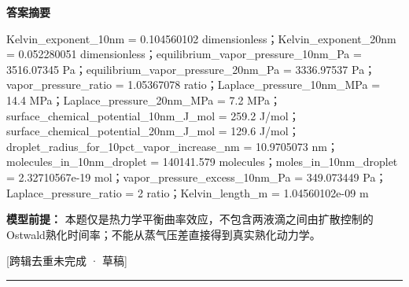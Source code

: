 \documentclass[UTF8,11pt,a4paper]{ctexart}
\begin{document}
\noindent\textbf{答案摘要}\par
Kelvin\_exponent\_10nm = 0.104560102 dimensionless；Kelvin\_exponent\_20nm = 0.052280051 dimensionless；equilibrium\_vapor\_pressure\_10nm\_Pa = 3516.07345 Pa；equilibrium\_vapor\_pressure\_20nm\_Pa = 3336.97537 Pa；vapor\_pressure\_ratio = 1.05367078 ratio；Laplace\_pressure\_10nm\_MPa = 14.4 MPa；Laplace\_pressure\_20nm\_MPa = 7.2 MPa；surface\_chemical\_potential\_10nm\_J\_mol = 259.2 J/mol；surface\_chemical\_potential\_20nm\_J\_mol = 129.6 J/mol；droplet\_radius\_for\_10pct\_vapor\_increase\_nm = 10.9705073 nm；molecules\_in\_10nm\_droplet = 140141.579 molecules；moles\_in\_10nm\_droplet = 2.32710567e-19 mol；vapor\_pressure\_excess\_10nm\_Pa = 349.073449 Pa；Laplace\_pressure\_ratio = 2 ratio；Kelvin\_length\_m = 1.04560102e-09 m\par
\noindent\textbf{模型前提：}
本题仅是热力学平衡曲率效应，不包含两液滴之间由扩散控制的Ostwald熟化时间率；不能从蒸气压差直接得到真实熟化动力学。\par
\noindent\textcolor{red!65!black}{[跨辑去重未完成 · 草稿]} \par
\medskip\hrule\medskip
{}
\end{document}
